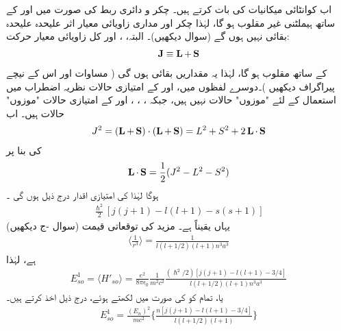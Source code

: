  اب کوانٹائی  میکانیات کی بات کرتے ہیں۔ چکر و دائری ربط کی صورت  میں  اور  کے ساتھ ہیملٹنی غیر مقلوب ہو گا،  لہٰذا چکر اور  مداری  زاویائی معیار اثر علیحدہ علیحدہ   بقائی  نہیں  ہوں گے   (سوال  دیکھیں)۔ البتہ،   ،  اور کل زاویائی معیار حرکت:
\begin{align}\label{مساوات_غیر_مضطرب_ایل_جمع_ایس_برابر_جے}
\operatorname{\mathbf{J}} \equiv \operatorname{\mathbf{L}} + \operatorname{\mathbf{S}}
\end{align}
کے ساتھ  مقلوب ہو گا،  لہٰذا   یہ مقداریں   بقائی  ہوں گی ( مساوات    اور اس کے نیچے پیراگراف دیکھیں )۔دوسرے لفظوں میں،   اور  کے امتیازی حالات نظریہ اضطراب میں استعمال کے لئے "موزوں" حالات نہیں ہیں،  جبکہ ، ، ، اور  کے امتیازی حالات  "موزوں" حالات ہیں۔ اب 
\begin{align*}
J^2 = (\operatorname{\mathbf{L}} + \operatorname{\mathbf{S}}) \cdot (\operatorname{\mathbf{L}} + \operatorname{\mathbf{S}}) = L^2 + S^2 + 2 \operatorname{\mathbf{L}} \cdot \operatorname{\mathbf{S}}
\end{align*}
کی بنا پر 
\begin{align}
\operatorname{\mathbf{L}} \cdot \operatorname{\mathbf{S}} = \frac{1}{2} (J^2 - L^2 - S^2)
\end{align}
ہوگا  لہٰذا    کی  امتیازی اقدار درج ذیل ہوں گی ۔
\begin{align*}
\frac{\hslash^2}{2} [j (j + 1) - l(l + 1) - s(s + 1)]
\end{align*}
یہاں یقیناً  ہے۔  مزید  کی توقعاتی قیمت  (سوال  -ج  دیکھیں) 
\begin{align}\label{مساوات_غیر_مضطرب_آر_تین}
\big\langle \frac{1}{r^3} \big\rangle = \frac{1}{l(l + 1/2) (l + 1) n^3 a^3} 
\end{align}
 ہے، لہٰذا   
\begin{align*}
E_{so}^1 = \langle H'_{so} \rangle = \frac{e^2}{8 \pi \epsilon_0} \frac{1}{m^2 c^2} \frac{(\hslash^2 /2) [j(j + 1) - l(l + 1) - 3/4]}{l(l + 1/2)(l + 1)n^3 a^3}
\end{align*} 
  یا، تمام  کو   کی صورت میں لکھتے ہوئے، درج ذیل اخذ کرتے ہیں۔ 
\begin{align}\label{مساوات_غیر_مضطرب_چکر_و_مدار_ربط}
E^1_{so} = \frac{(E_n)^2}{mc^2} \Big \{ \frac{n[j(j + 1) - l(l + 1) - 3/4]}{l(l + 1/2)(l + 1)} \Big \}
\end{align}

